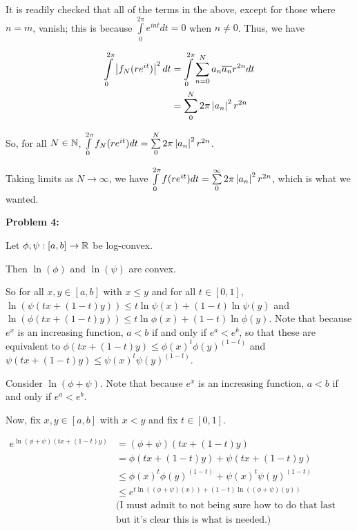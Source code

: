 \documentclass[a4paper,12pt]{article}
\begin{document}
It is readily checked that all of the terms in the above, except for those where $n=m$, vanish; this is because $\int\limits_0^{2\pi} e^{int}dt = 0$ when $n \neq 0$. Thus, we have

\begin{align*}
\int\limits_0^{2\pi} \left\lvert f_N(re^{it}) \right\rvert^2 dt &= \int\limits_0^{2\pi} \sum\limits_{n=0}^{N} a_n\overline{a_n}r^{2n} dt\\
&= \sum\limits_0^N 2\pi \left\lvert a_n \right\rvert^2 r^{2n}\\
\end{align*}

So, for all $N \in \mathbb{N}$, $\int\limits_0^{2\pi} f_N(re^{it})dt = \sum\limits_0^N 2\pi \left\lvert a_n \right\rvert^2 r^{2n}$.

Taking limits as $N \to \infty$, we have $\int\limits_0^{2\pi} f(re^{it})dt = \sum\limits_0^\infty 2\pi \left\lvert a_n \right\rvert^2 r^{2n}$, which is what we wanted.

\shunt

{\bf Problem 4:}

Let $\phi, \psi : [a,b] \to \mathbb{R}$ be log-convex.

Then $\ln(\phi)$ and $\ln(\psi)$ are convex.

So for all $x,y \in [a,b]$ with $x \leq y$ and for all $t \in [0,1]$, $\ln(\psi(tx+(1-t)y)) \leq t\ln\psi(x) + (1-t)\ln\psi(y)$ and $\ln(\phi(tx+(1-t)y)) \leq t\ln\phi(x) + (1-t)\ln\phi(y)$. Note that because $e^x$ is an increasing function, $a<b$ if and only if $e^a < e^b$, so that these are equivalent to $\phi(tx+(1-t)y) \leq \phi(x)^t\phi(y)^{(1-t)}$ and $\psi(tx+(1-t)y) \leq \psi(x)^t\psi(y)^{(1-t)}$. 

Consider $\ln(\phi + \psi)$. Note that because $e^x$ is an increasing function, $a<b$ if and only if $e^a < e^b$.

Now, fix $x,y \in [a,b]$ with $x<y$ and fix $t \in [0,1]$.

\begin{align*}
e^{\ln(\phi + \psi)(tx+(1-t)y)} &= (\phi + \psi)(tx+(1-t)y)\\
&= \phi(tx+(1-t)y) + \psi(tx+(1-t)y)\\
&\leq \phi(x)^t\phi(y)^{(1-t)} + \psi(x)^t\psi(y)^{(1-t)}\\
&\leq e^{t\ln((\phi+\psi)(x)) + (1-t)\ln((\phi+\psi)(y))} \\
&\text{(I must admit to not being sure how to do that last step,}\\
&\text{but it's clear this is what is needed.)}
\end{align*} %
\end{document}
